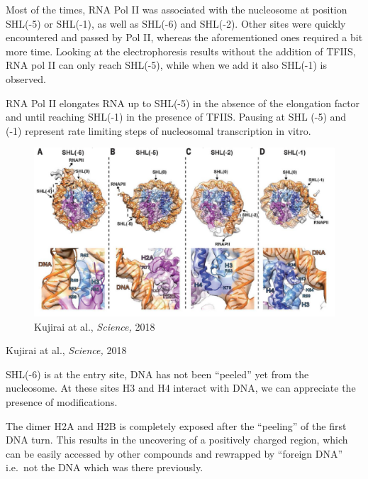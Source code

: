 Most of the times, RNA Pol II was associated with the nucleosome at position SHL(-5) or SHL(-1), as well as SHL(-6) and SHL(-2). Other sites were quickly encountered and passed by Pol II, whereas the aforementioned ones required a bit more time. Looking at the electrophoresis results without the addition of TFIIS, RNA pol II can only reach SHL(-5), while when we add it also SHL(-1) is observed.

RNA Pol II elongates RNA up to SHL(-5) in the absence of the elongation factor and until reaching SHL(-1) in the presence of TFIIS. Pausing at SHL (-5) and (-1) represent rate limiting steps of nucleosomal transcription in vitro.

\begin{figure}
\centering
\includegraphics[width=\textwidth]{../_resources/Screenshot_2022-10-05_at_22-54-39.png}
\caption{Kujirai at al., \emph{Science,} 2018}
\end{figure}

Kujirai at al., \emph{Science,} 2018

SHL(-6) is at the entry site, DNA has not been ``peeled'' yet from the nucleosome. At these sites H3 and H4 interact with DNA, we can appreciate the presence of modifications.

The dimer H2A and H2B is completely exposed after the ``peeling'' of the first DNA turn. This results in the uncovering of a positively charged region, which can be easily accessed by other compounds and rewrapped by ``foreign DNA'' i.e.~not the DNA which was there previously.

